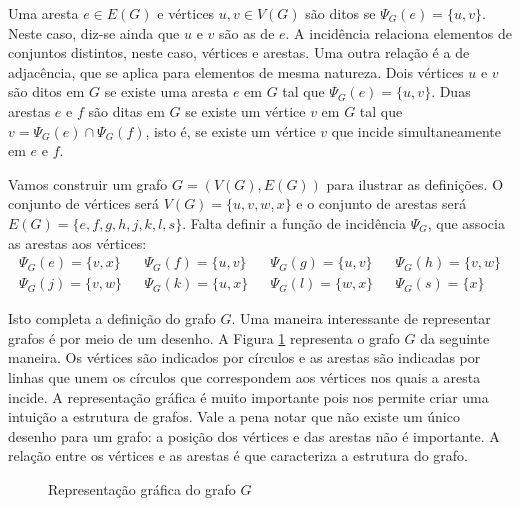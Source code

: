 Uma aresta $e \in E(G)$ e vértices $u, v \in V(G)$ são ditos  se $\Psi_G(e) = \{u,v\}$. Neste caso, diz-se ainda que $u$ e $v$ são as  de $e$. A incidência relaciona elementos de conjuntos distintos, neste caso, vértices e arestas.
Uma outra relação é a de adjacência, que se aplica para elementos de mesma natureza. Dois vértices $u$ e $v$ são ditos  em $G$ se existe uma aresta $e$ em $G$ tal que $\Psi_G(e) = \{u,v\}$. Duas arestas $e$ e $f$ são ditas  em $G$ se existe um vértice $v$ em $G$ tal que $v = \Psi_G(e) \cap \Psi_G(f)$, isto é, se existe um vértice $v$ que incide simultaneamente em $e$ e $f$.

Vamos construir um grafo $G = (V(G), E(G))$ para ilustrar as definições. O conjunto de vértices será $V(G) = \{u,v,w,x\}$ e o conjunto de arestas será $E(G) = \{e, f, g, h, j, k, l, s\}$. Falta definir a função de incidência $\Psi_G$, que associa as arestas aos vértices:
\begin{align*}
\Psi_G(e) = \{v,x\} & &
\Psi_G(f) = \{u,v\} & &
\Psi_G(g) = \{u,v\} & &
\Psi_G(h) = \{v,w\} \\
\Psi_G(j) = \{v,w\} & &
\Psi_G(k) = \{u,x\} & &
\Psi_G(l) = \{w,x\} & &
\Psi_G(s) = \{x\}
\end{align*}

Isto completa a definição do grafo $G$. Uma maneira interessante de representar grafos é por meio de um desenho. A Figura \ref{fig:grafo} representa o grafo $G$ da seguinte maneira. Os vértices são indicados por círculos e as arestas são indicadas por linhas que unem os círculos que correspondem aos vértices nos quais a aresta incide. A representação gráfica é muito importante pois nos permite criar uma intuição a estrutura de grafos. Vale a pena notar que não existe um único desenho para um grafo: a posição dos vértices e das arestas não é importante. A relação entre os vértices e as arestas é que caracteriza a estrutura do grafo.

\begin{figure}[h!]
\centering
{}
\caption{Representação gráfica do grafo $G$}
\label{fig:grafo}
\end{figure}

